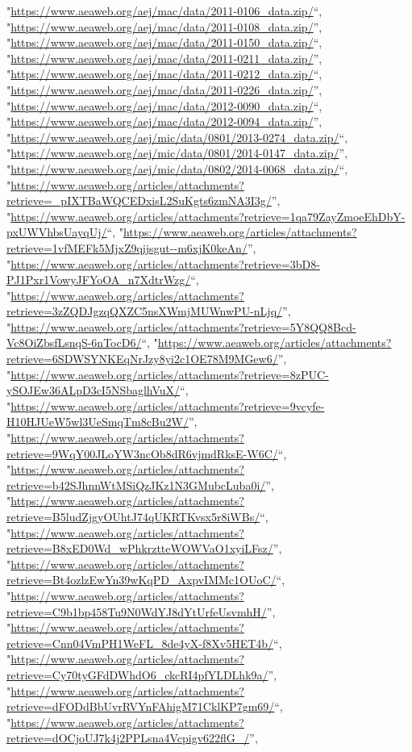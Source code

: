 \documentclass[]{article}
\begin{document}
\begin{itemize}
  "\url{https://www.aeaweb.org/aej/mac/data/2011-0106_data.zip/}``,
  "\url{https://www.aeaweb.org/aej/mac/data/2011-0108_data.zip/}'',
  "\url{https://www.aeaweb.org/aej/mac/data/2011-0150_data.zip/}``,
  "\url{https://www.aeaweb.org/aej/mac/data/2011-0211_data.zip/}'',
  "\url{https://www.aeaweb.org/aej/mac/data/2011-0212_data.zip/}``,
  "\url{https://www.aeaweb.org/aej/mac/data/2011-0226_data.zip/}'',
  "\url{https://www.aeaweb.org/aej/mac/data/2012-0090_data.zip/}``,
  "\url{https://www.aeaweb.org/aej/mac/data/2012-0094_data.zip/}'',
  "\url{https://www.aeaweb.org/aej/mic/data/0801/2013-0274_data.zip/}``,
  "\url{https://www.aeaweb.org/aej/mic/data/0801/2014-0147_data.zip/}'',
  "\url{https://www.aeaweb.org/aej/mic/data/0802/2014-0068_data.zip/}``,
  "\url{https://www.aeaweb.org/articles/attachments?retrieve=_pIXTBaWQCEDxisL2SuKgts6zmNA3I3g/}'',
  "\url{https://www.aeaweb.org/articles/attachments?retrieve=1qa79ZayZmoeEhDbY-pxUWVhbsUayqUj/}``,
  "\url{https://www.aeaweb.org/articles/attachments?retrieve=1vfMEFk5MjxZ9qijsgut--m6xjK0keAn/}'',
  "\url{https://www.aeaweb.org/articles/attachments?retrieve=3bD8-PJ1Pxr1VowyJFYoOA_n7XdtrWzg/}``,
  "\url{https://www.aeaweb.org/articles/attachments?retrieve=3zZQDJgzqQXZC5nsXWmjMUWnwPU-nLjq/}'',
  "\url{https://www.aeaweb.org/articles/attachments?retrieve=5Y8QQ8Bcd-Vc8OiZbsfLsnqS-6nTocD6/}``,
  "\url{https://www.aeaweb.org/articles/attachments?retrieve=6SDWSYNKEqNrJzy8yi2c1OE78M9MGew6/}'',
  "\url{https://www.aeaweb.org/articles/attachments?retrieve=8zPUC-ySOJEw36ALpD3cI5NSbaglhVuX/}``,
  "\url{https://www.aeaweb.org/articles/attachments?retrieve=9vcyfe-H10HJUeW5wl3UeSmqTm8cBu2W/}'',
  "\url{https://www.aeaweb.org/articles/attachments?retrieve=9WqY00JLoYW3ncOb8dR6vjmdRksE-W6C/}``,
  "\url{https://www.aeaweb.org/articles/attachments?retrieve=b42SJhnnWtMSiQzJKz1N3GMubcLuba0i/}'',
  "\url{https://www.aeaweb.org/articles/attachments?retrieve=B5ludZjgyOUhtJ74qUKRTKvsx5r8iWBs/}``,
  "\url{https://www.aeaweb.org/articles/attachments?retrieve=B8xED0Wd_wPhkrztteWOWVaO1xyiLFsz/}'',
  "\url{https://www.aeaweb.org/articles/attachments?retrieve=Bt4ozlzEwYn39wKqPD_AxpvIMMc1OUoC/}``,
  "\url{https://www.aeaweb.org/articles/attachments?retrieve=C9b1bp458Tu9N0WdYJ8dYtUrfeUsvmhH/}'',
  "\url{https://www.aeaweb.org/articles/attachments?retrieve=Cnn04VmPH1WeFL_8de4yX-f8Xv5HET4b/}``,
  "\url{https://www.aeaweb.org/articles/attachments?retrieve=Cy70tyGFdDWhdO6_ckcRI4pfYLDLhk9a/}'',
  "\url{https://www.aeaweb.org/articles/attachments?retrieve=dFODdBbUvrRVYnFAhigM71CklKP7gm69/}``,
  "\url{https://www.aeaweb.org/articles/attachments?retrieve=dOCjoUJ7k4j2PPLsna4Vcpigv622flG_/}'',

\end{itemize}
\end{document}
